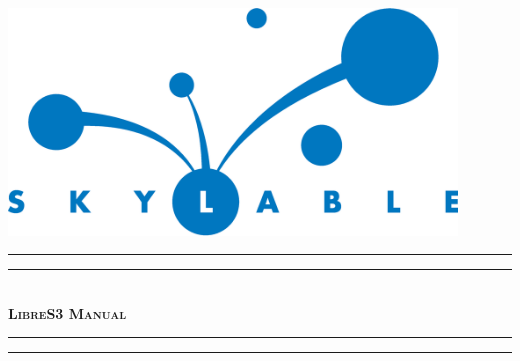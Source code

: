 \documentclass[oneside,a4paper]{memoir}
\begin{document}
\pagestyle{empty}

\begin{center}
    \includegraphics[width=119mm]{logo.eps}\\
    \vspace{4cm}
    \rule{\textwidth}{1.6pt}\vspace*{-\baselineskip}\vspace*{2pt}
    \rule{\textwidth}{0.4pt}\\[\baselineskip]
    {\fontsize{40}{50}\bfseries\scshape LibreS3 Manual}
    \rule{\textwidth}{0.4pt}\vspace*{-\baselineskip}\vspace{3.2pt}
    \rule{\textwidth}{1.6pt}\\[\baselineskip]
\end{center}

\newpage
\tableofcontents
\vspace{1.0cm}








\end{document}
